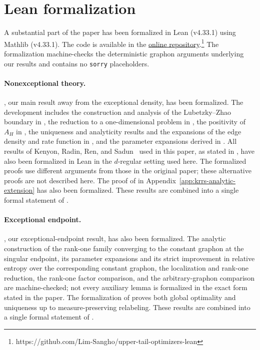 \section{Lean formalization}\label{sec:lean-formalization}

A substantial part of the paper has been formalized in Lean (v4.33.1) using
Mathlib (v4.33.1).  The code is available in the
\href{https://github.com/Lim-Sangho/upper-tail-optimizers-lean}{online
repository}.\footnote{https://github.com/Lim-Sangho/upper-tail-optimizers-lean}
The formalization machine-checks the deterministic graphon arguments
underlying our results and contains no \texttt{sorry} placeholders.

\paragraph{Nonexceptional theory.}
, our main result away from the
exceptional density, has been formalized.
The development includes the construction and analysis of the
Lubetzky--Zhao boundary in
, the reduction to a one-dimensional problem in
, the positivity of $A_H$ in
, the uniqueness and analyticity results and the
expansions of the edge density and rate function in
, and the parameter expansions derived in
.
All results of Kenyon, Radin, Ren, and Sadun~\cite{kenyon2014entropy}
used in this paper, as stated in ,
have also been formalized in Lean in the $d$-regular setting used here.
The formalized proofs use different
arguments from those in the original paper; these alternative proofs are
not described here.  The proof of  in
Appendix~\ref{app:krrs-analytic-extension} has also been formalized.
These results are combined into a single formal statement of
.

\paragraph{Exceptional endpoint.}
, our exceptional-endpoint result, has also
been formalized.
The analytic construction of the rank-one family converging to the
constant graphon at the singular endpoint, its parameter expansions and its strict
improvement in relative entropy over the corresponding constant graphon,
the localization and rank-one reduction, the rank-one
factor comparison, and the arbitrary-graphon comparison are
machine-checked; not every auxiliary lemma is formalized in the exact
form stated in the paper.  The formalization of 
proves both global optimality and uniqueness up to measure-preserving relabeling.
These results are combined into a single formal statement of
.

